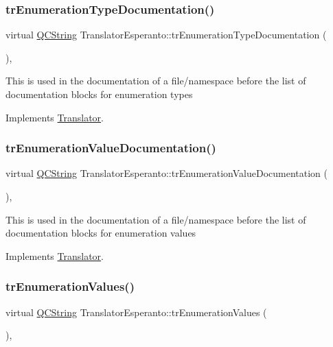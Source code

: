 \subsubsection{\texorpdfstring{trEnumerationTypeDocumentation()}{trEnumerationTypeDocumentation()}}
{\footnotesize\ttfamily virtual \mbox{\hyperlink{class_q_c_string}{Q\+C\+String}} Translator\+Esperanto\+::tr\+Enumeration\+Type\+Documentation (\begin{DoxyParamCaption}{ }\end{DoxyParamCaption})\hspace{0.3cm}{\ttfamily [inline]}, {\ttfamily [virtual]}}

This is used in the documentation of a file/namespace before the list of documentation blocks for enumeration types 

Implements \mbox{\hyperlink{class_translator}{Translator}}.

\mbox{\label{class_translator_esperanto_a42b3855c9bba0a257e7a08854ee1bef9}} 
\subsubsection{\texorpdfstring{trEnumerationValueDocumentation()}{trEnumerationValueDocumentation()}}
{\footnotesize\ttfamily virtual \mbox{\hyperlink{class_q_c_string}{Q\+C\+String}} Translator\+Esperanto\+::tr\+Enumeration\+Value\+Documentation (\begin{DoxyParamCaption}{ }\end{DoxyParamCaption})\hspace{0.3cm}{\ttfamily [inline]}, {\ttfamily [virtual]}}

This is used in the documentation of a file/namespace before the list of documentation blocks for enumeration values 

Implements \mbox{\hyperlink{class_translator}{Translator}}.

\mbox{\label{class_translator_esperanto_a88eeb34ec5b98f853be2350e19fc2339}} 
\subsubsection{\texorpdfstring{trEnumerationValues()}{trEnumerationValues()}}
{\footnotesize\ttfamily virtual \mbox{\hyperlink{class_q_c_string}{Q\+C\+String}} Translator\+Esperanto\+::tr\+Enumeration\+Values (\begin{DoxyParamCaption}{ }\end{DoxyParamCaption})\hspace{0.3cm}{\ttfamily [inline]}, {\ttfamily [virtual]}}

